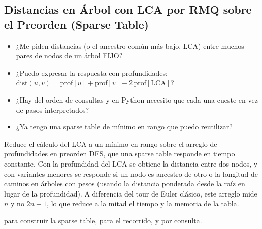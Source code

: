\subsection{Distancias en Árbol con LCA por RMQ sobre el Preorden (Sparse Table)}
\label{alg:4-17}


\begin{itemize}
\item ¿Me piden distancias (o el ancestro común más bajo, LCA) entre muchos pares de nodos de un árbol FIJO?
\item ¿Puedo expresar la respuesta con profundidades: $\text{dist}(u,v) = \text{prof}[u] + \text{prof}[v] - 2\,\text{prof}[\text{LCA}]$?
\item ¿Hay del orden de  consultas y en Python necesito que cada una cueste  en vez de  pasos interpretados?
\item ¿Ya tengo una sparse table de mínimo en rango que puedo reutilizar?
\end{itemize}

 Reduce el cálculo del LCA a un mínimo en rango sobre el arreglo de profundidades en preorden DFS, que una sparse table responde en tiempo constante. Con la profundidad del LCA se obtiene la distancia entre dos nodos, y con variantes menores se responde si un nodo es ancestro de otro o la longitud de caminos en árboles con pesos (usando la distancia ponderada desde la raíz en lugar de la profundidad). A diferencia del tour de Euler clásico, este arreglo mide $n$ y no $2n-1$, lo que reduce a la mitad el tiempo y la memoria de la tabla.

  para construir la sparse table,  para el recorrido, y  por consulta.


